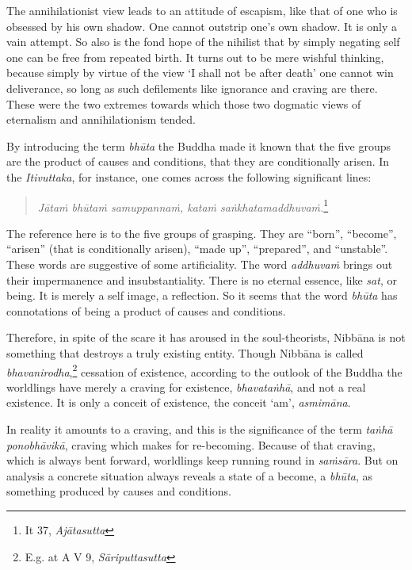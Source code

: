 The annihilationist view leads to an attitude of escapism, like that of one who is obsessed by his own shadow. One cannot outstrip one's own shadow. It is only a vain attempt. So also is the fond hope of the nihilist that by simply negating self one can be free from repeated birth. It turns out to be mere wishful thinking, because simply by virtue of the view `I shall not be after death' one cannot win deliverance, so long as such defilements like ignorance and craving are there. These were the two extremes towards which those two dogmatic views of eternalism and annihilationism tended.

By introducing the term \emph{bhūta} the Buddha made it known that the five groups are the product of causes and conditions, that they are conditionally arisen. In the \emph{Itivuttaka}, for instance, one comes across the following significant lines:

\begin{quote}
\emph{Jātaṁ bhūtaṁ samuppannaṁ, kataṁ saṅkhatamaddhuvaṁ.}\footnote{It 37, \emph{Ajātasutta}}
\end{quote}

The reference here is to the five groups of grasping. They are ``born'', ``become'', ``arisen'' (that is conditionally arisen), ``made up'', ``prepared'', and ``unstable''. These words are suggestive of some artificiality. The word \emph{addhuvaṁ} brings out their impermanence and insubstantiality. There is no eternal essence, like \emph{sat}, or being. It is merely a self image, a reflection. So it seems that the word \emph{bhūta} has connotations of being a product of causes and conditions.

Therefore, in spite of the scare it has aroused in the soul-theorists, Nibbāna is not something that destroys a truly existing entity. Though Nibbāna is called \emph{bhavanirodha},\footnote{E.g. at A V 9, \emph{Sāriputtasutta}} cessation of existence, according to the outlook of the Buddha the worldlings have merely a craving for existence, \emph{bhavataṅhā}, and not a real existence. It is only a conceit of existence, the conceit `am', \emph{asmimāna}.

In reality it amounts to a craving, and this is the significance of the term \emph{taṅhā ponobhāvikā}, craving which makes for re-becoming. Because of that craving, which is always bent forward, worldlings keep running round in \emph{saṁsāra}. But on analysis a concrete situation always reveals a state of a become, a \emph{bhūta}, as something produced by causes and conditions.

